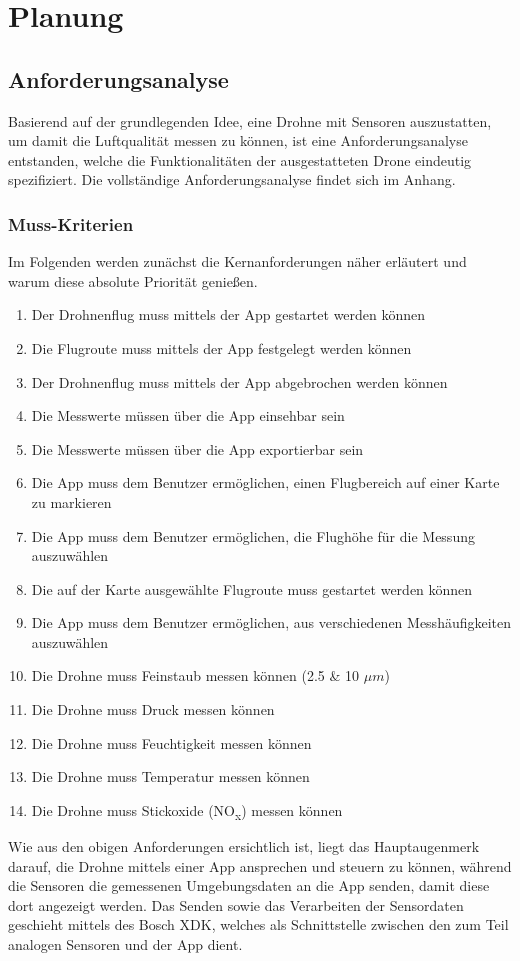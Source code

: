 
\chapter{Planung}\label{cha:Planung}
\section{Anforderungsanalyse}\label{sec:Anforderungsanalyse}
Basierend auf der grundlegenden Idee, eine Drohne mit Sensoren auszustatten, um damit die Luftqualität messen zu können, ist eine Anforderungsanalyse entstanden, welche die Funktionalitäten der ausgestatteten Drone eindeutig spezifiziert. Die vollständige Anforderungsanalyse findet sich im Anhang.
\subsection{Muss-Kriterien}\label{subsec:MussKrit}
Im Folgenden werden zunächst die Kernanforderungen näher erläutert und warum diese absolute Priorität genießen.
\newline
\begin{enumerate}[label=\roman*.]
	\item Der Drohnenflug muss mittels der App gestartet werden können
	\item Die Flugroute muss mittels der App festgelegt werden können
	\item Der Drohnenflug muss mittels der App abgebrochen werden können
	\item Die Messwerte müssen über die App einsehbar sein
	\item Die Messwerte müssen über die App exportierbar sein
	\item Die App muss dem Benutzer ermöglichen, einen Flugbereich auf einer Karte zu markieren
	\item Die App muss dem Benutzer ermöglichen, die Flughöhe für die Messung auszuwählen
	\item Die auf der Karte ausgewählte Flugroute muss gestartet werden können
	\item Die App muss dem Benutzer ermöglichen, aus verschiedenen Messhäufigkeiten auszuwählen
	\item Die Drohne muss Feinstaub messen können (2.5 \& 10 $\mu m$)
	\item Die Drohne muss Druck messen können
	\item Die Drohne muss Feuchtigkeit messen können
	\item Die Drohne muss Temperatur messen können
	\item Die Drohne muss Stickoxide (NO\textsubscript{x}) messen können	
\end{enumerate}
Wie aus den obigen Anforderungen ersichtlich ist, liegt das Hauptaugenmerk darauf, die Drohne mittels einer App ansprechen und steuern zu können, während die Sensoren die gemessenen Umgebungsdaten an die App senden, damit diese dort angezeigt werden. Das Senden sowie das Verarbeiten der Sensordaten geschieht mittels des Bosch \acf{XDK}, welches als Schnittstelle zwischen den zum Teil analogen Sensoren und der App dient.
